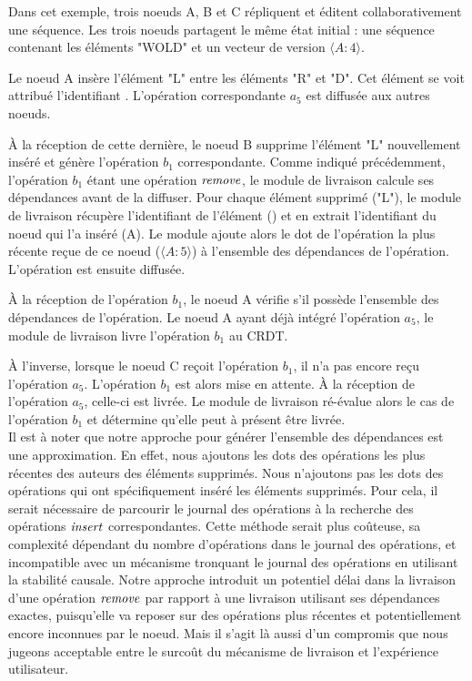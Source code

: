 Dans cet exemple, trois noeuds A, B et C répliquent et éditent collaborativement une séquence.
Les trois noeuds partagent le même état initial : une séquence contenant les éléments "WOLD" et un vecteur de version $\langle A:4 \rangle$.

Le noeud A insère l'élément "L" entre les éléments "R" et "D".
Cet élément se voit attribué l'identifiant .
L'opération correspondante $a_5$ est diffusée aux autres noeuds.

À la réception de cette dernière, le noeud B supprime l'élément "L" nouvellement inséré et génère l'opération $b_1$ correspondante.
Comme indiqué précédemment, l'opération $b_1$ étant une opération $\mathit{remove}$, le module de livraison calcule ses dépendances avant de la diffuser.
Pour chaque élément supprimé ("L"), le module de livraison récupère l'identifiant de l'élément () et en extrait l'identifiant du noeud qui l'a inséré (A).
Le module ajoute alors le dot de l'opération la plus récente reçue de ce noeud ($\langle A:5 \rangle$) à l'ensemble des dépendances de l'opération.
L'opération est ensuite diffusée.

À la réception de l'opération $b_1$, le noeud A vérifie s'il possède l'ensemble des dépendances de l'opération.
Le noeud A ayant déjà intégré l'opération $a_5$, le module de livraison livre l'opération $b_1$ au \ac{CRDT}.

À l'inverse, lorsque le noeud C reçoit l'opération $b_1$, il n'a pas encore reçu l'opération $a_5$.
L'opération $b_1$ est alors mise en attente.
À la réception de l'opération $a_5$, celle-ci est livrée.
Le module de livraison ré-évalue alors le cas de l'opération $b_1$ et détermine qu'elle peut à présent être livrée.\\

Il est à noter que notre approche pour générer l'ensemble des dépendances est une approximation.
En effet, nous ajoutons les dots des opérations les plus récentes des auteurs des éléments supprimés.
Nous n'ajoutons pas les dots des opérations qui ont spécifiquement inséré les éléments supprimés.
Pour cela, il serait nécessaire de parcourir le journal des opérations à la recherche des opérations $\mathit{insert}$ correspondantes.
Cette méthode serait plus coûteuse, sa complexité dépendant du nombre d'opérations dans le journal des opérations, et incompatible avec un mécanisme tronquant le journal des opérations en utilisant la stabilité causale.
Notre approche introduit un potentiel délai dans la livraison d'une opération $\mathit{remove}$ par rapport à une livraison utilisant ses dépendances exactes, puisqu'elle va reposer sur des opérations plus récentes et potentiellement encore inconnues par le noeud.
Mais il s'agit là aussi d'un compromis que nous jugeons acceptable entre le surcoût du mécanisme de livraison et l'expérience utilisateur.

